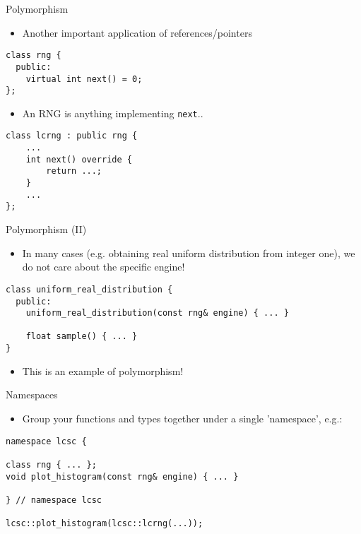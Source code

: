 \documentclass[10pt]{beamer}
\begin{document}
\begin{frame}[fragile,label={sec:org635c15e}]{Polymorphism}
 \begin{itemize}
\item Another important application of references/pointers
\end{itemize}

\begin{verbatim}
class rng {
  public:
    virtual int next() = 0;
};
\end{verbatim}

\begin{itemize}
\item An RNG is anything implementing \texttt{next}..
\end{itemize}

\begin{verbatim}
class lcrng : public rng {
    ...
    int next() override {
        return ...;
    }
    ...
};
\end{verbatim}
\end{frame}

\begin{frame}[fragile,label={sec:org9358df0}]{Polymorphism (II)}
 \begin{itemize}
\item In many cases (e.g. obtaining real uniform distribution from integer one), we
do not care about the specific engine!
\end{itemize}

\begin{verbatim}
class uniform_real_distribution {
  public:
    uniform_real_distribution(const rng& engine) { ... }

    float sample() { ... }
}
\end{verbatim}

\begin{itemize}
\item This is an example of polymorphism!
\end{itemize}
\end{frame}

\begin{frame}[fragile,label={sec:org8eb7331}]{Namespaces}
 \begin{itemize}
\item Group your functions and types together under a single 'namespace', e.g.:
\end{itemize}

\begin{verbatim}
namespace lcsc {

class rng { ... };
void plot_histogram(const rng& engine) { ... }

} // namespace lcsc

lcsc::plot_histogram(lcsc::lcrng(...));
\end{verbatim}
\end{frame}
\end{document}
